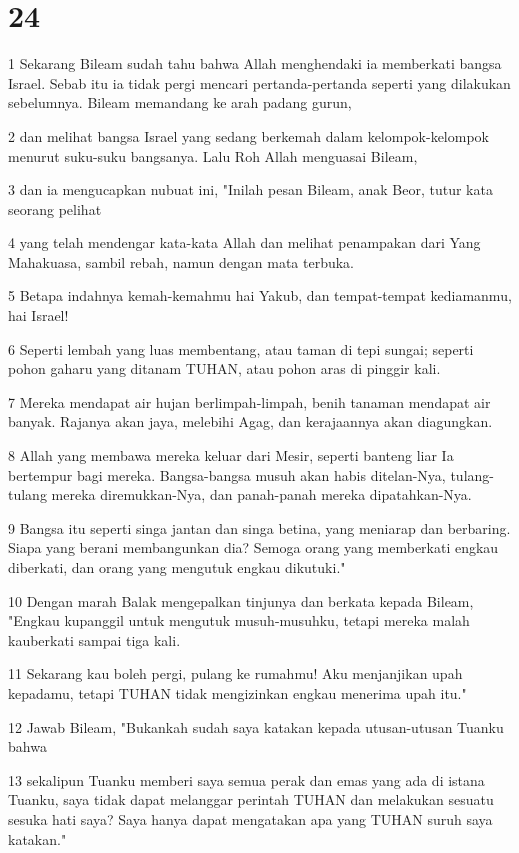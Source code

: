 \chapter{24}

\par 1 Sekarang Bileam sudah tahu bahwa Allah menghendaki ia memberkati bangsa Israel. Sebab itu ia tidak pergi mencari pertanda-pertanda seperti yang dilakukan sebelumnya. Bileam memandang ke arah padang gurun,
\par 2 dan melihat bangsa Israel yang sedang berkemah dalam kelompok-kelompok menurut suku-suku bangsanya. Lalu Roh Allah menguasai Bileam,
\par 3 dan ia mengucapkan nubuat ini, "Inilah pesan Bileam, anak Beor, tutur kata seorang pelihat
\par 4 yang telah mendengar kata-kata Allah dan melihat penampakan dari Yang Mahakuasa, sambil rebah, namun dengan mata terbuka.
\par 5 Betapa indahnya kemah-kemahmu hai Yakub, dan tempat-tempat kediamanmu, hai Israel!
\par 6 Seperti lembah yang luas membentang, atau taman di tepi sungai; seperti pohon gaharu yang ditanam TUHAN, atau pohon aras di pinggir kali.
\par 7 Mereka mendapat air hujan berlimpah-limpah, benih tanaman mendapat air banyak. Rajanya akan jaya, melebihi Agag, dan kerajaannya akan diagungkan.
\par 8 Allah yang membawa mereka keluar dari Mesir, seperti banteng liar Ia bertempur bagi mereka. Bangsa-bangsa musuh akan habis ditelan-Nya, tulang-tulang mereka diremukkan-Nya, dan panah-panah mereka dipatahkan-Nya.
\par 9 Bangsa itu seperti singa jantan dan singa betina, yang meniarap dan berbaring. Siapa yang berani membangunkan dia? Semoga orang yang memberkati engkau diberkati, dan orang yang mengutuk engkau dikutuki."
\par 10 Dengan marah Balak mengepalkan tinjunya dan berkata kepada Bileam, "Engkau kupanggil untuk mengutuk musuh-musuhku, tetapi mereka malah kauberkati sampai tiga kali.
\par 11 Sekarang kau boleh pergi, pulang ke rumahmu! Aku menjanjikan upah kepadamu, tetapi TUHAN tidak mengizinkan engkau menerima upah itu."
\par 12 Jawab Bileam, "Bukankah sudah saya katakan kepada utusan-utusan Tuanku bahwa
\par 13 sekalipun Tuanku memberi saya semua perak dan emas yang ada di istana Tuanku, saya tidak dapat melanggar perintah TUHAN dan melakukan sesuatu sesuka hati saya? Saya hanya dapat mengatakan apa yang TUHAN suruh saya katakan."
